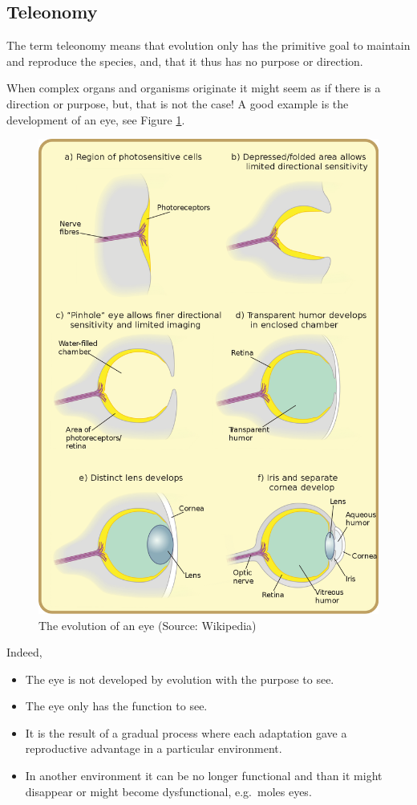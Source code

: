 \documentclass[
  11pt,
]{book}
\begin{document}
\hypertarget{teleonomy}{%
\subsection{Teleonomy}\label{teleonomy}}

The term teleonomy means that evolution only has the primitive goal to maintain and reproduce the species, and, that it thus has no purpose or direction.

When complex organs and organisms originate it might seem as if there is a direction or purpose, but, that is not the case! A good example is the development of an eye, see Figure \ref{fig:evolutionEye}.

\begin{figure}

{\centering \includegraphics[width=0.45\linewidth]{./figs/evolutionEye} 

}

\caption{The evolution of an eye (Source: Wikipedia)}\label{fig:evolutionEye}
\end{figure}

Indeed,

\begin{itemize}
\item
  The eye is not developed by evolution with the purpose to see.
\item
  The eye only has the function to see.
\item
  It is the result of a gradual process where each adaptation gave a reproductive advantage in a particular environment.
\item
  In another environment it can be no longer functional and than it might disappear or might become dysfunctional, e.g.~moles eyes.
\end{itemize}
\end{document}
